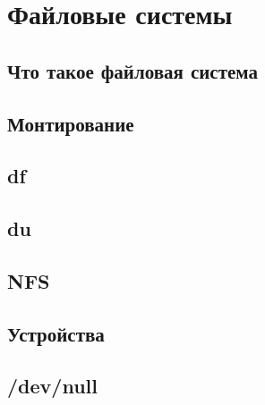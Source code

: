 \section{Файловые системы}
\subsection{Что такое файловая система}
\subsection{Монтирование}
\subsection{df}
\subsection{du}
\subsection{NFS}
\subsection{Устройства}
\subsection{/dev/null}


%
\newpage